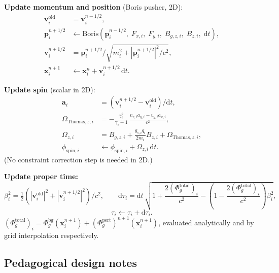 \documentclass[11pt,a4paper]{article}
\newcommand{\vv}[1]{\mathbf{#1}}
\newcommand{\Phig}{\Phi_g}
\newcommand{\dd}{\mathrm{d}}
\begin{document}
\begin{algsteps}
  \item \textbf{Update momentum and position} (Boris pusher, 2D):
  \begin{align}
    \vv{v}_i^{\mathrm{old}} &= \vv{v}_i^{n-1/2}, \\
    \vv{p}_i^{n+1/2} &\leftarrow \text{Boris}(\vv{p}_i^{n-1/2},\; F_{x,i},\; F_{y,i},\; B_{g,z,i},\; B_{z,i},\; \dd t), \\
    \vv{v}_i^{n+1/2} &= \vv{p}_i^{n+1/2} / \sqrt{m_i^2 + |\vv{p}_i^{n+1/2}|^2/c^2}, \\
    \vv{x}_i^{n+1}   &\leftarrow \vv{x}_i^n + \vv{v}_i^{n+1/2}\,\dd t.
  \end{align}

  \item \textbf{Update spin} (scalar in 2D):
  \begin{align}
    \vv{a}_i &= (\vv{v}_i^{n+1/2} - \vv{v}_i^{\mathrm{old}})/\dd t, \\
    \Omega_{\mathrm{Thomas},z,i} &= -\frac{\gamma_i^2}{\gamma_i+1}\,\frac{v_{x,i}a_{y,i} - v_{y,i}a_{x,i}}{c^2}, \\
    \Omega_{z,i} &= B_{g,z,i} + \frac{g_{s,i}q_i}{2m_i}B_{z,i} + \Omega_{\mathrm{Thomas},z,i}, \\
    \phi_{\mathrm{spin},i} &\leftarrow \phi_{\mathrm{spin},i} + \Omega_{z,i}\,\dd t.
  \end{align}
  (No constraint correction step is needed in 2D.)

  \item \textbf{Update proper time:}
  \begin{equation}
    \beta_i^2 = \tfrac{1}{2}\!\left(|\vv{v}_i^{\mathrm{old}}|^2 + |\vv{v}_i^{n+1/2}|^2\right)/c^2, \qquad
    \dd\tau_i = \dd t\,\sqrt{1 + \frac{2(\Phig^{\mathrm{total}})_i}{c^2}
                             - \left(1-\frac{2(\Phig^{\mathrm{total}})_i}{c^2}\right)\beta_i^2},
  \end{equation}
  \begin{equation}
    \tau_i \leftarrow \tau_i + \dd\tau_i.
  \end{equation}
  $(\Phig^{\mathrm{total}})_i = \Phig^{\mathrm{bg}}(\vv{x}_i^{n+1}) + (\Phig^{\mathrm{pert}})^{n+1}(\vv{x}_i^{n+1})$, evaluated analytically and by grid interpolation respectively.
\end{algsteps}

\subsection{Pedagogical design notes}
\end{document}
